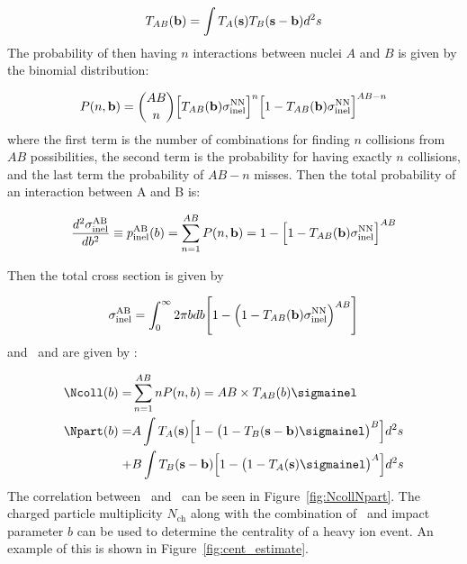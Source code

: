 \begin{align}
T_{AB}({\bf b}) = \int T_{A} ({\bf s}) T_{B} ({\bf s-\bf b}) d^2 s
\end{align}
The probability of then having $n$ interactions between nuclei $A$ and $B$ is given by the binomial distribution:

\begin{align}
P(n, { \bf b}) = {{AB} \choose {n}} \Big[T_{AB}( {\bf b} ) \sigma_{\mathrm{inel}}^{\mathrm{NN}} \Big]^n \Big[ 1 - T_{AB}( {\bf b} ) \sigma_{\mathrm{inel}}^{\mathrm{NN}} \Big]^{AB-n}
\end{align}
where the first term is the number of combinations for finding $n$ collisions from $AB$ possibilities, the second term is the probability for having exactly $n$ collisions, and the last term the probability of $AB-n$ misses.
Then the total probability of an interaction between A and B is:

\begin{align}
\frac{d^2  \sigma_{\mathrm{inel}}^{\mathrm{AB}} }{db^2} \equiv p_{\mathrm{inel}}^{\mathrm{AB}} (b) = \sum_{n=1}^{AB} P(n, {\bf b}) = 1- \Big[ 1 - T_{AB}( {\bf b} ) \sigma_{\mathrm{inel}}^{\mathrm{NN}} \Big]^{AB}
\end{align}

Then the total cross section is given by

\begin{align}
\sigma_{\mathrm{inel}}^{\mathrm{AB}} = \int_0^\infty 2\pi b db \Bigg[ 1- \Big( 1 - T_{AB}( {\bf b} ) \sigma_{\mathrm{inel}}^{\mathrm{NN}}  \Big)^{AB} \Bigg]
\end{align}
and \Ncoll\ and \Npart are given by \cite{Kharzeev:2000ph, Bialas:1976ed}:

\begin{align}
\Ncoll (b) = & \sum_{n=1}^{AB} n P(n, b) =  AB \times T_{AB}(b) \sigmainel \\
\Npart (b) = & A \int T_A ({\bf s}) \Big[ 1 - \big(1-T_B ({\bf s - b}) \sigmainel \big)^B \Big] d^2 s \\
+ & B \int T_B ({\bf s-b}) \Big[ 1 - \big(1-T_A ({\bf s}) \sigmainel \big)^A \Big] d^2 s \nonumber
\end{align}
The correlation between \Ncoll\ and \Npart\ can be seen in Figure~\ref{fig:NcollNpart}.
The charged particle multiplicity $N_{\mathrm{ch}}$ along with the combination of \Npart\ and impact parameter $b$ can be used to determine the centrality of a heavy ion event.
An example of this is shown in Figure~\ref{fig:cent_estimate}.

